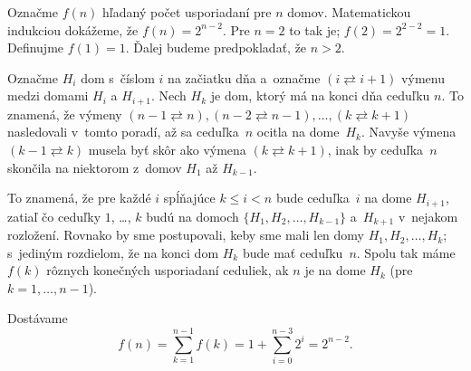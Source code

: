 {%
Označme $f(n)$ hľadaný počet usporiadaní pre $n$ domov. Matematickou indukciou dokážeme, že $f(n) = 2^{n-2}$. Pre $n=2$ to tak je; $f(2) = 2^{2-2}=1$. Definujme $f(1) = 1$. Ďalej budeme predpokladať, že $n>2$.

Označme $H_i$ dom s~číslom $i$ na začiatku dňa a~označme $(i \rightleftarrows i+1)$ výmenu medzi domami $H_i$ a $H_{i+1}$. Nech $H_k$ je dom, ktorý má na konci dňa ceduľku $n$. To znamená, že výmeny $(n-1 \rightleftarrows n), (n-2 \rightleftarrows n-1), \dots, (k \rightleftarrows k+1)$ nasledovali v~tomto poradí, až sa ceduľka~$n$ ocitla na dome~$H_k$. Navyše výmena
$(k-1 \rightleftarrows k)$ musela byť skôr ako výmena $(k \rightleftarrows k+1)$, inak by ceduľka~$n$ skončila na niektorom z~domov $H_1$ až $H_{k-1}$.

To znamená, že pre každé $i$ spĺňajúce $k \le i < n$ bude ceduľka~$i$ na dome $H_{i+1}$, zatiaľ čo ceduľky $1$, \dots, $k$ budú na domoch $\{H_1,H_2,\dots,H_ {k-1}\}$ a~$H_{k+1}$ v~nejakom rozložení. Rovnako by sme postupovali, keby sme mali len domy $H_1,H_2,\dots,H_k$; s~jediným rozdielom, že na konci dom $H_k$ bude mať ceduľku~$n$. Spolu tak máme $f(k)$ rôznych konečných usporiadaní ceduliek, ak $n$ je na dome $H_k$ (pre $k=1,\dots,n-1$).

Dostávame
$$
f(n) = \sum_{k=1}^{n-1} f(k) = 1 + \sum_{i=0}^{n-3} 2^i = 2^{n-2}.
$$}

